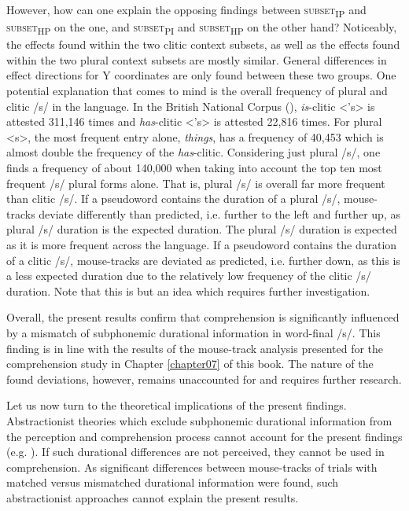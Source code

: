 However, how can one explain the opposing findings between \textsc{subset\textsubscript{IP}} and \textsc{subset\textsubscript{HP}} on the one, and \textsc{subset\textsubscript{PI}} and \textsc{subset\textsubscript{HP}} on the other hand? Noticeably, the effects found within the two clitic context subsets, as well as the effects found within the two plural context subsets are mostly similar. General differences in effect directions for Y coordinates are only found between these two groups. One potential explanation that comes to mind is the overall frequency of plural and clitic /s/ in the language. In the British National Corpus (\cite{Davies2004}), \textit{is}-clitic <’s> is attested 311,146 times and \textit{has}-clitic <’s> is attested 22,816 times. For plural <s>, the most frequent entry alone, \textit{things}, has a frequency of 40,453 which is almost double the frequency of the \textit{has}-clitic. Considering just plural /s/, one finds a frequency of about 140,000 when taking into account the top ten most frequent /s/ plural forms alone. That is, plural /s/ is overall far more frequent than clitic /s/. If a pseudoword contains the duration of a plural /s/, mouse-tracks deviate differently than predicted, i.e. further to the left and further up, as plural /s/ duration is the expected duration. The plural /s/ duration is expected as it is more frequent across the language. If a pseudoword contains the duration of a clitic /s/, mouse-tracks are deviated as predicted, i.e. further down, as this is a less expected duration due to the relatively low frequency of the clitic /s/ duration. Note that this is but an idea which requires further investigation.

Overall, the present results confirm that comprehension is significantly influenced by a mismatch of subphonemic durational information in word-final /s/. This finding is in line with the results of the mouse-track analysis presented for the comprehension study in Chapter \ref{chapter07} of this book. The nature of the found deviations, however, remains unaccounted for and requires further research.

Let us now turn to the theoretical implications of the present findings. Abstractionist theories which exclude subphonemic durational information from the perception and comprehension process cannot account for the present findings (e.g. \cite{Klatt1979, McClelland1986, Norris1994, Norris2008}). If such durational differences are not perceived, they cannot be used in comprehension. As significant differences between mouse-tracks of trials with matched versus mismatched durational information were found, such abstractionist approaches cannot explain the present results.

